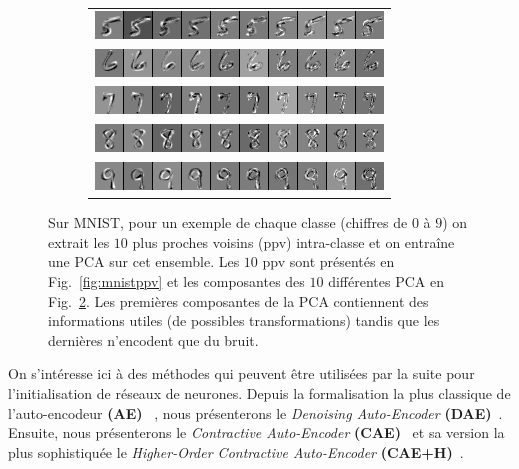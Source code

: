 \begin{figure}
\begin{subfigure}{0.45\textwidth}
\begin{tabular}{c}
  \includegraphics[width=0.90\linewidth]{predoc/images/5_eigenvectors.png}\\
  \includegraphics[width=0.90\linewidth]{predoc/images/6_eigenvectors.png}\\
  \includegraphics[width=0.90\linewidth]{predoc/images/7_eigenvectors.png}\\
  \includegraphics[width=0.90\linewidth]{predoc/images/8_eigenvectors.png}\\
  \includegraphics[width=0.90\linewidth]{predoc/images/9_eigenvectors.png}
\end{tabular}
\label{fig:mnistpca}
\end{subfigure}

   \caption{Sur MNIST, pour un exemple de chaque classe (chiffres de $0$ à $9$) on
   extrait les $10$ plus proches voisins (ppv) intra-classe et on entraîne une PCA sur cet
   ensemble. Les $10$ ppv sont présentés en Fig.~\ref{fig:mnistppv} et les
   composantes des $10$ différentes PCA en Fig.~\ref{fig:mnistpca}. Les premières composantes de
   la PCA contiennent des informations utiles (de possibles transformations)
   tandis que les dernières n'encodent que du bruit.}

\end{figure}


On s'intéresse ici à des méthodes qui peuvent être utilisées par la suite pour
l'initialisation de réseaux de neurones.
Depuis la formalisation la plus classique de l'auto-encodeur
\textbf{(AE)}~\cite{Gallinari87} , nous présenterons le \textit{Denoising
Auto-Encoder} \textbf{(DAE)}~\cite{VincentPLarochelleH2008,Vincent-JMLR-2010}.
Ensuite, nous présenterons le \textit{Contractive Auto-Encoder}
\textbf{(CAE)}~\cite{Rifai+al-2011,Salah+al-2011} et sa version la plus
sophistiquée le \textit{Higher-Order Contractive Auto-Encoder}
\textbf{(CAE+H)}~\cite{Salah+al-2011}.

